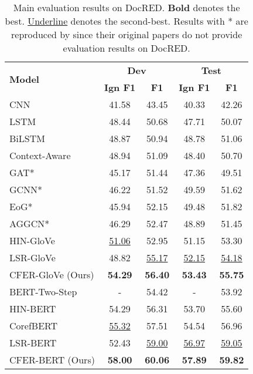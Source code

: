 \documentclass[letterpaper]{article} \usepackage{aaai21}  \usepackage{times}  \usepackage{helvet} \usepackage{courier}  \usepackage[hyphens]{url}  \usepackage{graphicx} \urlstyle{rm} \def\UrlFont{\rm}  \usepackage{natbib}  \usepackage{caption} \frenchspacing  \setlength{\pdfpagewidth}{8.5in}  \setlength{\pdfpageheight}{11in}
\begin{document}
\begin{table*}[t]
\centering
\setlength{\tabcolsep}{10pt}
\begin{tabular}{l | c c | c c}
\toprule
\multirow{2}{*}{\textbf{Model}} & \multicolumn{2}{c}{\textbf{Dev}} & \multicolumn{2}{c}{\textbf{Test}} \\ 
& \textbf{Ign F1} & \textbf{F1} & \textbf{Ign F1} & \textbf{F1}  \\ 
\midrule
\midrule
CNN~\citep{docred} & 41.58 & 43.45 & 40.33 & 42.26 \\
LSTM~\citep{docred} & 48.44 & 50.68 & 47.71 & 50.07 \\
BiLSTM~\citep{docred} & 48.87 & 50.94 & 48.78 & 51.06 \\
Context-Aware~\citep{docred} & 48.94 & 51.09 & 48.40 & 50.70 \\
\midrule
GAT*~\citep{gat} & 45.17 & 51.44 & 47.36 & 49.51 \\
GCNN*~\citep{gcnn} & 46.22 & 51.52 & 49.59 & 51.62 \\
EoG*~\citep{eog} & 45.94 & 52.15 & 49.48 & 51.82 \\
AGGCN*~\citep{aggcn} & 46.29 & 52.47 & 48.89 & 51.45 \\
HIN-GloVe~\citep{hin} & \underline{51.06} & 52.95 & 51.15 & 53.30 \\
LSR-GloVe~\citep{lsr} & 48.82 & \underline{55.17} & \underline{52.15} & \underline{54.18} \\
CFER-GloVe (Ours) & \textbf{54.29} & \textbf{56.40} & \textbf{53.43} & \textbf{55.75} \\
\midrule
BERT-Two-Step~\citep{bert_two_step} & - & 54.42 & - & 53.92 \\
HIN-BERT~\citep{hin} & 54.29 & 56.31 & 53.70 & 55.60 \\
CorefBERT~\citep{coref_bert} & \underline{55.32} & 57.51 & 54.54 & 56.96 \\
LSR-BERT~\citep{lsr} & 52.43 & \underline{59.00} & \underline{56.97} & \underline{59.05} \\
CFER-BERT (Ours) & \textbf{58.00} & \textbf{60.06} & \textbf{57.89} & \textbf{59.82} \\
\bottomrule
\end{tabular}
\caption{Main evaluation results on DocRED. \textbf{Bold} denotes the best. \underline{Underline} denotes the second-best. Results with * are reproduced by \citet{lsr} since their original papers do not provide evaluation results on DocRED. }
\label{tab:docred_rlt}
\end{table*}
\end{document}
